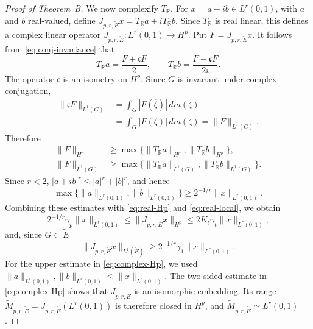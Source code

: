 \documentclass[10pt,a4paper]{amsart}
\newcommand{\R}{\mathbb{R}}
\begin{document}
\begin{proof}[Proof of Theorem~B]
We now complexify \(T_{\R}\).  For
\(x=a+ib\in L^r(0,1)\), with \(a\) and \(b\) real-valued, define
\(J_{p,r,\widetilde E}x=T_{\R}a+iT_{\R}b\). Since \(T_{\R}\) is real linear, this defines a complex linear operator
\(J_{p,r,\widetilde E}:L^r(0,1)\to H^p\).
Put \(F=J_{p,r,\widetilde E}x\).  It follows from
\eqref{eq:conj-invariance} that
\[
        T_{\R}a
        =
        \frac{F+\mathfrak cF}{2},
        \qquad
        T_{\R}b
        =
        \frac{F-\mathfrak cF}{2i}.
\]
The operator \(\mathfrak c\) is an isometry on \(H^p\).  Since \(G\)
is invariant under complex conjugation,
\[
\begin{aligned}
        \|\mathfrak cF\|_{L^1(G)}
        &=
        \int_G|F(\overline\zeta)|\,dm(\zeta)\\
        &=
        \int_G|F(\zeta)|\,dm(\zeta)
        =
        \|F\|_{L^1(G)}.
\end{aligned}
\]
Therefore
\[
\begin{aligned}
        \|F\|_{H^p}
        &\ge
        \max\bigl\{
        \|T_{\R}a\|_{H^p},
        \|T_{\R}b\|_{H^p}
        \bigr\},\\
        \|F\|_{L^1(G)}
        &\ge
        \max\bigl\{
        \|T_{\R}a\|_{L^1(G)},
        \|T_{\R}b\|_{L^1(G)}
        \bigr\}.
\end{aligned}
\]
Since \(r<2\), \(|a+ib|^r\le |a|^r+|b|^r\), and hence
\[
        \max\bigl\{
        \|a\|_{L^r(0,1)},
        \|b\|_{L^r(0,1)}
        \bigr\}
        \ge
        2^{-1/r}\|x\|_{L^r(0,1)}.
\]
Combining these estimates with
\eqref{eq:real-Hp} and
\eqref{eq:real-local}, we obtain
\begin{equation}
\label{eq:complex-Hp}
        2^{-1/r}\gamma_p\|x\|_{L^r(0,1)}
        \le
        \|J_{p,r,\widetilde E}x\|_{H^p}
        \le
        2K_t\gamma_t\|x\|_{L^r(0,1)},
\end{equation}
and,  since \(G\subset\widetilde E\) 
\begin{equation}
\label{eq:complex-local}
        \|J_{p,r,\widetilde E}x\|_{L^1(\widetilde E)}
        \ge
        2^{-1/r}\gamma_1\|x\|_{L^r(0,1)}.
\end{equation}
For the upper estimate in
\eqref{eq:complex-Hp}, we used
\(\|a\|_{L^r(0,1)},\|b\|_{L^r(0,1)}
\le\|x\|_{L^r(0,1)}\).
The two-sided estimate in
\eqref{eq:complex-Hp} shows that
\(J_{p,r,\widetilde E}\) is an isomorphic embedding.  Its range
\(\widetilde M_{p,r,\widetilde E}
=J_{p,r,\widetilde E}(L^r(0,1))\)
is therefore closed in \(H^p\), and
\(\widetilde M_{p,r,\widetilde E}\simeq L^r(0,1)\).


\end{proof}
\end{document}
